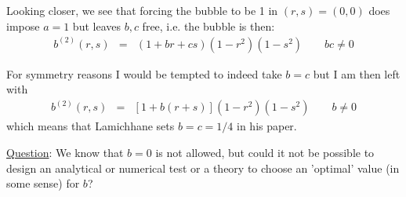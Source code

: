 Looking closer, we see that forcing the bubble to be 1 in $(r,s)=(0,0)$ does impose
$a=1$ but leaves $b,c$ free, i.e. the bubble is then:
\begin{eqnarray}
b^{(2)}(r,s) &=& (1+br+cs)(1-r^2)(1-s^2) \qquad bc\neq 0
\end{eqnarray}

For symmetry reasons I would be tempted to indeed take $b=c$ but I am then left with 
\begin{eqnarray}
b^{(2)}(r,s) &=&  [1+b(r+s)](1-r^2)(1-s^2) \qquad b\neq 0
\end{eqnarray}
which means that Lamichhane sets $b=c=1/4$ in his paper. 

\underline{Question}: We know that $b=0$ is not allowed, but could it not be 
possible to design an analytical or numerical test or a 
theory to choose an 'optimal' value (in some sense) for $b$?  







